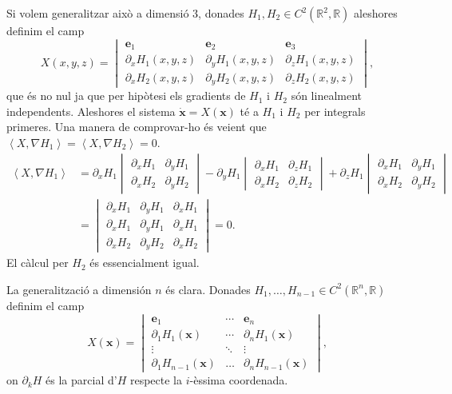 \documentclass[12pt]{article}
\renewcommand{\vec}[1]{\mathbf{#1}}
\newcommand{\R}{\mathbb{R}}
\newcommand{\inn}[2]{\left\langle #1 , #2 \right\rangle}
\begin{document}
Si volem generalitzar això a dimensió 3, donades \( H_1, H_2 \in C^2(\R^2, \R) \) aleshores definim el camp
\begin{equation*}
	X(x, y, z) = \begin{vmatrix}
		\vec{e}_1 & \vec{e}_2 & \vec{e}_3 \\
		\partial_x H_1(x,y,z) & \partial_y H_1(x,y,z) & \partial_z H_1(x,y,z) \\
		\partial_x H_2(x,y,z) & \partial_y H_2(x,y,z) & \partial_z H_2(x,y,z) 
	\end{vmatrix},
\end{equation*}
que és no nul ja que per hipòtesi els gradients de \( H_1 \) i \( H_2 \) són linealment independents. Aleshores el sistema \( \dot{\vec{x}} = X(\vec{x}) \) té a \( H_1 \) i \( H_2 \) per integrals primeres. Una manera de comprovar-ho és veient que \( \inn{X}{\nabla H_1} = \inn{X}{\nabla H_2} = 0 \).  
\begin{align*}
	\inn{X}{\nabla H_1} & = \partial_x H_1 \begin{vmatrix}
		\partial_x H_1 & \partial_y H_1 \\
		\partial_x H_2 & \partial_y H_2 
	\end{vmatrix}
- \partial_y H_1 \begin{vmatrix}
		\partial_x H_1 & \partial_z H_1 \\
		\partial_x H_2 & \partial_z H_2 
	\end{vmatrix}
+ \partial_z H_1 \begin{vmatrix}
		\partial_x H_1 & \partial_y H_1 \\
		\partial_x H_2 & \partial_y H_2 
	\end{vmatrix} \\
	& = \begin{vmatrix}
		\partial_x H_1 & \partial_y H_1 & \partial_x H_1 \\
		\partial_x H_1 & \partial_y H_1 & \partial_x H_1 \\
		\partial_x H_2 & \partial_y H_2 & \partial_x H_2 
	\end{vmatrix} = 0.
\end{align*}
El càlcul per \( H_2 \) és essencialment igual.  

La generalització a dimensión \( n \) és clara. Donades \( H_1, \dots, H_{n-1} \in C^2(\R^{n}, \R) \) definim el camp
\begin{equation} \label{eq:determinant}
	X(\vec{x}) = \begin{vmatrix}
		\vec{e}_1 & \cdots & \vec{e}_n \\
		\partial_1 H_1(\vec{x}) & \cdots & \partial_n H_1(\vec{x}) \\
		\vdots & \ddots & \vdots \\ 
		\partial_1 H_{n-1}(\vec{x}) & \dots & \partial_n H_{n-1}(\vec{x}) 
	\end{vmatrix},
\end{equation}
on \( \partial_k H \) és la parcial d'\( H \) respecte la \( i \)-èssima coordenada.
\end{document}
